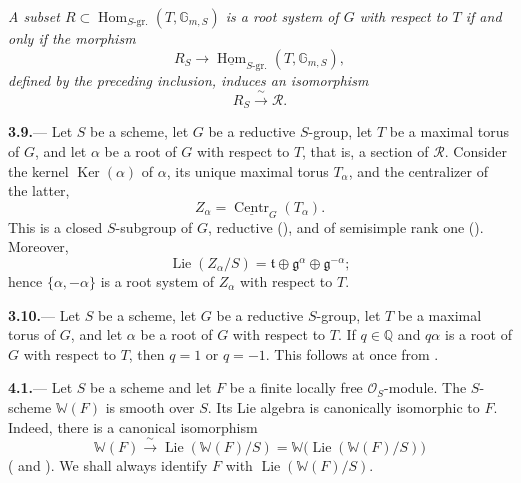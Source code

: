 \textit{A subset
\(R\subset
\operatorname{Hom}_{S\text{-gr.}}(T,\mathbb G_{m,S})\)
is a root system of \(G\) with respect to \(T\) if and only if the
morphism}
\[
  R_S
  \longrightarrow
  \underline{\operatorname{Hom}}_{S\text{-gr.}}
  (T,\mathbb G_{m,S}),
\]
\textit{defined by the preceding inclusion, induces an isomorphism}
\[
  R_S\xrightarrow{\ \sim\ }\mathcal R.
\]

\par\medskip\noindent
\textbf{3.9.}---
Let \(S\) be a scheme, let \(G\) be a reductive \(S\)-group, let \(T\)
be a maximal torus of \(G\), and let \(\alpha\) be a root of \(G\)
with respect to \(T\), that is, a section of \(\mathcal R\).  Consider
the kernel \(\operatorname{Ker}(\alpha)\) of \(\alpha\), its unique
maximal torus \(T_\alpha\), and the centralizer of the latter,
\[
  Z_\alpha=\underline{\operatorname{Centr}}_G(T_\alpha).
\]
This is a closed \(S\)-subgroup of \(G\), reductive (), and of
semisimple rank one ().  Moreover,
\[
  \operatorname{Lie}(Z_\alpha/S)
  =
  \mathfrak t
  \oplus\mathfrak g^\alpha
  \oplus\mathfrak g^{-\alpha};
\]
hence \(\{\alpha,-\alpha\}\) is a root system of \(Z_\alpha\) with
respect to \(T\).

\par\medskip\noindent
\textbf{3.10.}---
Let \(S\) be a scheme, let \(G\) be a reductive \(S\)-group, let \(T\)
be a maximal torus of \(G\), and let \(\alpha\) be a root of \(G\)
with respect to \(T\).  If \(q\in\mathbb Q\) and \(q\alpha\) is a root
of \(G\) with respect to \(T\), then \(q=1\) or \(q=-1\).  This follows
at once from .



\par\medskip\noindent
\textbf{4.1.}---
Let \(S\) be a scheme and let \(F\) be a finite locally free
\(\mathcal O_S\)-module.  The \(S\)-scheme \(\mathbb W(F)\) is smooth
over \(S\).  Its Lie algebra is canonically isomorphic to \(F\).
Indeed, there is a canonical isomorphism
\[
  \mathbb W(F)
  \xrightarrow{\ \sim\ }
  \operatorname{Lie}(\mathbb W(F)/S)
  =
  \mathbb W\bigl(\operatorname{Lie}(\mathbb W(F)/S)\bigr)
\]
\textup{( and )}.  We shall always identify
\(F\) with \(\operatorname{Lie}(\mathbb W(F)/S)\).

